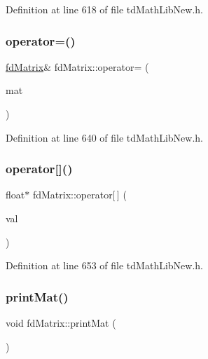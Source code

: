 Definition at line 618 of file td\+Math\+Lib\+New.\+h.

\hypertarget{classfd_matrix_a9bd773f3db300618603c63e54b2bb43d}{}\label{classfd_matrix_a9bd773f3db300618603c63e54b2bb43d} 
\subsubsection{\texorpdfstring{operator=()}{operator=()}}
{\footnotesize\ttfamily \hyperlink{classfd_matrix}{fd\+Matrix}\& fd\+Matrix\+::operator= (\begin{DoxyParamCaption}\item[{const \hyperlink{classfd_matrix}{fd\+Matrix} \&}]{mat }\end{DoxyParamCaption})\hspace{0.3cm}{\ttfamily [inline]}}



Definition at line 640 of file td\+Math\+Lib\+New.\+h.

\hypertarget{classfd_matrix_af1431514b36a3949f2e8ac58c8a79466}{}\label{classfd_matrix_af1431514b36a3949f2e8ac58c8a79466} 
\subsubsection{\texorpdfstring{operator[]()}{operator[]()}}
{\footnotesize\ttfamily float$\ast$ fd\+Matrix\+::operator\mbox{[}$\,$\mbox{]} (\begin{DoxyParamCaption}\item[{int}]{val }\end{DoxyParamCaption})\hspace{0.3cm}{\ttfamily [inline]}}



Definition at line 653 of file td\+Math\+Lib\+New.\+h.

\hypertarget{classfd_matrix_a65bc1f60c320690dd6b65a27b516c8f0}{}\label{classfd_matrix_a65bc1f60c320690dd6b65a27b516c8f0} 
\subsubsection{\texorpdfstring{print\+Mat()}{printMat()}}
{\footnotesize\ttfamily void fd\+Matrix\+::print\+Mat (\begin{DoxyParamCaption}{ }\end{DoxyParamCaption})\hspace{0.3cm}{\ttfamily [inline]}}



